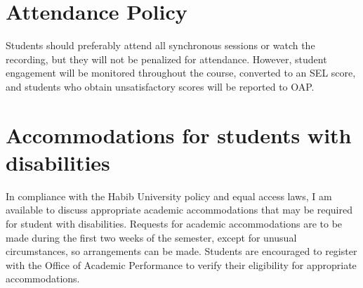 \documentclass[a4paper,11pt]{article}
\begin{document}


\section{Attendance Policy}
Students should preferably attend all synchronous sessions or watch the recording, but they will not be penalized for attendance. However, student engagement will be monitored throughout the course, converted to an SEL score, and students who obtain unsatisfactory scores will be reported to OAP. 


\section{Accommodations for students with disabilities}
In compliance with the Habib University policy and equal access laws, I am available to discuss appropriate academic accommodations that may be required for student with disabilities. Requests for academic accommodations are to be made during the first two weeks of the semester, except for unusual circumstances, so arrangements can be made. Students are encouraged to register with the Office of Academic Performance to verify their eligibility for appropriate accommodations.
\end{document}
